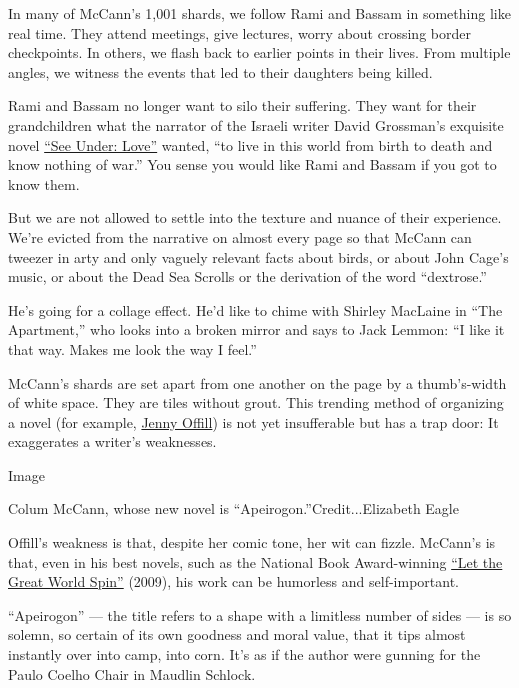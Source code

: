In many of McCann's 1,001 shards, we follow Rami and Bassam in something
like real time. They attend meetings, give lectures, worry about
crossing border checkpoints. In others, we flash back to earlier points
in their lives. From multiple angles, we witness the events that led to
their daughters being killed.

Rami and Bassam no longer want to silo their suffering. They want for
their grandchildren what the narrator of the Israeli writer David
Grossman's exquisite novel
\href{https://www.nytimes.com/1989/04/04/books/books-of-the-times-wrestling-with-the-beast-of-the-holocaust.html}{``See
Under: Love''} wanted, ``to live in this world from birth to death and
know nothing of war.'' You sense you would like Rami and Bassam if you
got to know them.

But we are not allowed to settle into the texture and nuance of their
experience. We're evicted from the narrative on almost every page so
that McCann can tweezer in arty and only vaguely relevant facts about
birds, or about John Cage's music, or about the Dead Sea Scrolls or the
derivation of the word ``dextrose.''

He's going for a collage effect. He'd like to chime with Shirley
MacLaine in ``The Apartment,'' who looks into a broken mirror and says
to Jack Lemmon: ``I like it that way. Makes me look the way I feel.''

McCann's shards are set apart from one another on the page by a
thumb's-width of white space. They are tiles without grout. This
trending method of organizing a novel (for example,
\href{https://www.nytimes.com/2020/01/31/books/review-weather-jenny-offill.html}{Jenny
Offill}) is not yet insufferable but has a trap door: It exaggerates a
writer's weaknesses.

Image

Colum McCann, whose new novel is ``Apeirogon.''Credit...Elizabeth Eagle

Offill's weakness is that, despite her comic tone, her wit can fizzle.
McCann's is that, even in his best novels, such as the National Book
Award-winning
\href{https://www.nytimes.com/2009/08/02/books/review/Mahler-t.html}{``Let
the Great World Spin''} (2009), his work can be humorless and
self-important.

``Apeirogon'' --- the title refers to a shape with a limitless number of
sides --- is so solemn, so certain of its own goodness and moral value,
that it tips almost instantly over into camp, into corn. It's as if the
author were gunning for the Paulo Coelho Chair in Maudlin Schlock.

